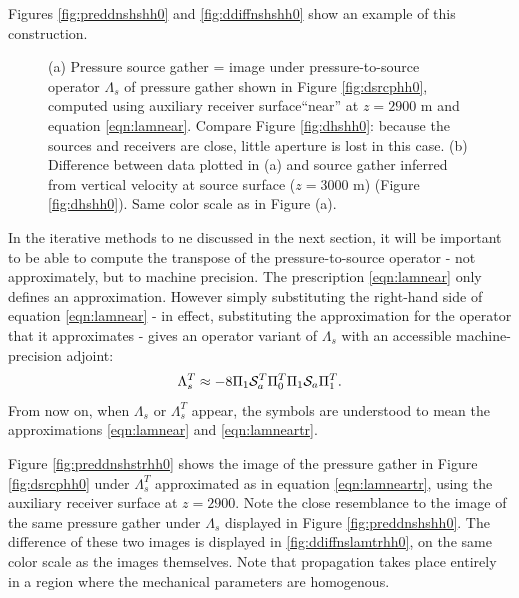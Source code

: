 \documentclass[georeport,12pt]{geophysics}
\begin{document}
Figures
\ref{fig:preddnshshh0} and \ref{fig:ddiffnshshh0} show an example of
this construction.

\begin{figure}
  \centering
  \caption{(a) Pressure source gather = image
  under pressure-to-source operator $\Lambda_s$ of pressure gather
  shown in Figure \ref{fig:dsrcphh0}, computed using
  auxiliary receiver surface``near''  at $z=2900$ m and equation \ref{eqn:lamnear}. Compare Figure
  \ref{fig:dhshh0}: because the sources and
  receivers are close, little aperture is lost in this case. (b)
  Difference between data plotted in (a)
  and source gather
  inferred from vertical velocity at source
  surface ($z=3000$ m) (Figure \ref{fig:dhshh0}). Same color scale as in Figure
  (a).}
\end{figure}

In the iterative methods to ne discussed in the next section, it will
be important to be able to compute the transpose of the
pressure-to-source operator - not approximately, but to machine
precision. The prescription \ref{eqn:lamnear} only
defines an approximation. However simply substituting the right-hand
side of equation \ref{eqn:lamnear} - in effect, substituting the
approximation for the operator that it approximates - gives an
operator variant of $\Lambda_s$ with an accessible
machine-precision adjoint:
\begin{equation}
  \label{eqn:lamneartr}
 \Lambda_s^T \approx -8\Pi_1{\cal S}_a^T\Pi_0^T\Pi_1 {\cal S}_a\Pi_1^T. 
\end{equation}
From now on, when $\Lambda_s$ or $\Lambda_s^T$ appear, the symbols are
understood to mean the approximations \ref{eqn:lamnear} and
\ref{eqn:lamneartr}.

Figure \ref{fig:preddnshstrhh0} shows the image of the pressure gather
in Figure \ref{fig:dsrcphh0} under $\Lambda_s^T$ approximated as in
equation \ref{eqn:lamneartr},
using the auxiliary receiver surface at $z=2900$. Note
the close resemblance to the image of the same pressure gather under
$\Lambda_s$ displayed in Figure
\ref{fig:preddnshshh0}. The difference of these two images is
displayed in \ref{fig:ddiffnslamtrhh0}, on the same color scale as the
images themselves. Note that propagation takes place entirely in a
region where the mechanical parameters are homogenous.
\end{document}
